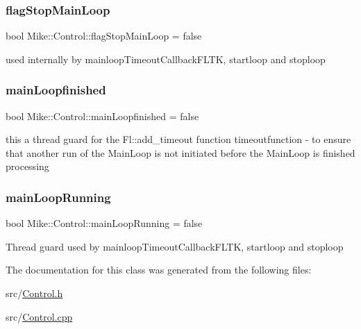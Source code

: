 \subsubsection{\texorpdfstring{flag\+Stop\+Main\+Loop}{flagStopMainLoop}}
{\footnotesize\ttfamily bool Mike\+::\+Control\+::flag\+Stop\+Main\+Loop = false\hspace{0.3cm}{\ttfamily [private]}}

used internally by mainloop\+Timeout\+Callback\+F\+L\+TK, startloop and stoploop \mbox{\label{class_mike_1_1_control_a7749b97976e1bb3e7ea49c7d63531dfc}} 
\subsubsection{\texorpdfstring{main\+Loopfinished}{mainLoopfinished}}
{\footnotesize\ttfamily bool Mike\+::\+Control\+::main\+Loopfinished = false\hspace{0.3cm}{\ttfamily [private]}}

this a \textquotesingle{}thread guard\textquotesingle{} for the Fl\+::add\+\_\+timeout function timeoutfunction -\/ to ensure that another run of the Main\+Loop is not initiated before the Main\+Loop is finished processing \mbox{\label{class_mike_1_1_control_af17a58f80bda54fda5b0a5167c8f04ed}} 
\subsubsection{\texorpdfstring{main\+Loop\+Running}{mainLoopRunning}}
{\footnotesize\ttfamily bool Mike\+::\+Control\+::main\+Loop\+Running = false\hspace{0.3cm}{\ttfamily [private]}}

\textquotesingle{}Thread guard\textquotesingle{} used by mainloop\+Timeout\+Callback\+F\+L\+TK, startloop and stoploop 

The documentation for this class was generated from the following files\+:\begin{DoxyCompactItemize}
\item 
src/\hyperlink{_control_8h}{Control.\+h}\item 
src/\hyperlink{_control_8cpp}{Control.\+cpp}\end{DoxyCompactItemize}
